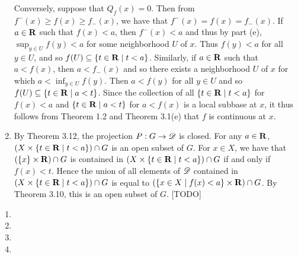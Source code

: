 \begin{prob}
\begin{enumerate}
Conversely, suppose that $Q_f(x) = 0$. Then from $f^-(x) \geq f(x) \geq f_-(x)$, we have that $f^-(x) = f(x) = f_-(x)$. If $a \in \mathbf{R}$ such that $f(x) < a$, then $f^-(x) < a$ and thus by part (e), $\sup_{y \in U}f(y) < a$ for some neighborhood $U$ of $x$. Thus $f(y) < a$ for all $y \in U$, and so $f(U) \subseteq \{t \in \mathbf{R}\mid t < a\}$. Similarly, if $a \in \mathbf{R}$ such that $a < f(x)$, then $a < f_-(x)$ and so there exists a neighborhood $U$ of $x$ for which $a < \inf_{y \in U}f(y)$. Then $a < f(y)$ for all $y \in U$ and so $f(U) \subseteq \{t \in \mathbf{R}\mid a < t\}$. Since the collection of all $\{t \in \mathbf{R}\mid t < a\}$ for $f(x) < a$ and $\{t \in \mathbf{R}\mid a < t\}$ for $a < f(x)$ is a local subbase at $x$, it thus follows from Theorem 1.2 and Theorem 3.1(e) that $f$ is continuous at $x$.

\item By Theorem 3.12, the projection $P: G \to \mathscr{D}$ is closed. For any $a \in \mathbf{R}$, $(X\times \{t \in \mathbf{R}\mid t < a\}) \cap G$ is an open subset of $G$. For $x \in X$, we have that $(\{x\}\times\mathbf{R})\cap G$ is contained in $(X\times\{t \in \mathbf{R}\mid t < a\})\cap G$ if and only if $f(x) < t$. Hence the union of all elements of $\mathscr{D}$ contained in $(X\times \{t \in \mathbf{R}\mid t < a\}) \cap G$ is equal to $(\{x \in X\mid f(x) < a\}\times\mathbf{R})\cap G$. By Theorem 3.10, this is an open subset of $G$. [TODO]
\end{enumerate}
\end{prob}

\begin{prob}
\begin{enumerate}
\item 

\item 

\item 

\item 
\end{enumerate}
\end{prob}

\begin{prob}

\end{prob}

\begin{prob}

\end{prob}

\begin{prob}

\end{prob}

